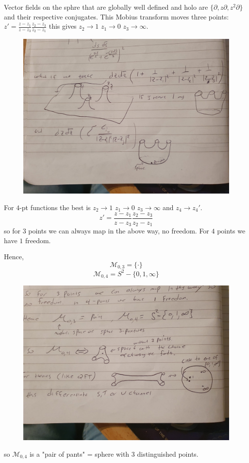 \documentclass[10pt,
 article,
 amsmath,amssymb
]{revtex4-2}
\begin{document}
Vector fields on the sphre that are globally well defined and holo are $\{\partial, z \partial , z^2 \partial\}$ and their respective 
conjugates. This Mobius transform moves three points:
$z'=\frac{z-z_1}{z-z_3} \frac{z_2-z_3}{z_2-z_1}$ this gives $z_2 \to 1$ $z_1 \to 0$ $z_3 \to \infty$.
\begin{figure}
    \begin{center}
        \includegraphics[scale=0.2]{complexs}
    \end{center}
\end{figure}
For $4$-pt functions the best is $z_2 \to 1$ $z_1 \to 0$ $z_3 \to \infty$ and $z_4 \to z_4'$. $$z'=\frac{z-z_1}{z-z_3}\frac{z_2-z_3}{z_2-z_1}$$
so for $3$ points we can always map in the above way, no freedom. For $4$ points we have $1$ freedom. 

Hence, $$\mathcal{M}_{0,3}= \{\cdot\}$$
$$\mathcal{M}_{0,4}=S^2-\{0,1,\infty\}$$
\begin{figure}
    \begin{center}
        \includegraphics[scale=0.2]{moduli3}
    \end{center}
\end{figure}
so $\mathcal{M}_{0,4}$ is a "pair of pants" = sphere with 3 distinguished points.
\end{document}
